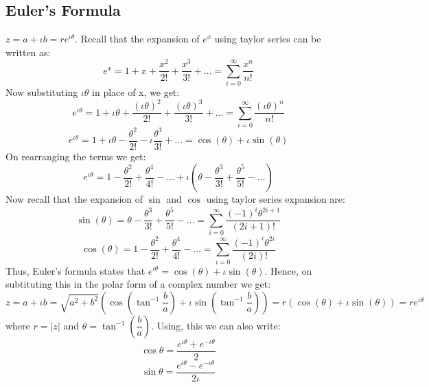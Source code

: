 \documentclass[12pt, oneside]{book}
\theoremstyle{definition}
\theoremstyle{definition}
\theoremstyle{remark}
\begin{document}
\subsection{Euler's Formula}
$z=a+\iota b=re^{\iota \theta}$. Recall that the expansion of $e^x$ using taylor series can be written as:
\[ e^x=1+x+\dfrac{x^2}{2!}+\dfrac{x^3}{3!}+\ldots = \sum_{i=0}^{\infty} \dfrac{x^n}{n!}\]
Now substituting $\iota \theta$ in place of x, we get:
\[ e^{\iota \theta}=1+\iota \theta+\dfrac{(\iota \theta)^2}{2!}+\dfrac{(\iota \theta)^3}{3!}+\ldots = \sum_{i=0}^{\infty} \dfrac{(\iota \theta)^n}{n!}\]
\[ e^{\iota \theta}=1+\iota \theta-\dfrac{\theta^2}{2!}-\iota \dfrac{\theta^3}{3!}+\ldots = \cos(\theta)+\iota \sin(\theta) \]
On rearranging the terms we get:
\[ e^{\iota \theta}= 1-\dfrac{\theta^2}{2!} + \dfrac{\theta^4}{4!} - \ldots + \iota(\theta-\dfrac{\theta^3}{3!}+\dfrac{\theta^5}{5!}-\ldots) \]
Now recall that the expansion of $\sin$ and $\cos$ using taylor series expansion are:
\[ \sin(\theta)=\theta-\dfrac{\theta^3}{3!}+\dfrac{\theta^5}{5!}-\ldots = \sum_{i=0}^{\infty} \dfrac{(-1)^i\theta^{2i+1}}{(2i+1)!} \]
\[ \cos(\theta)=1-\dfrac{\theta^2}{2!}+\dfrac{\theta^4}{4!}-\ldots = \sum_{i=0}^{\infty} \dfrac{(-1)^i\theta^{2i}}{(2i)!} \]
Thus, Euler's formula states that $e^{\iota \theta}=\cos(\theta)+\iota \sin(\theta)$.
Hence, on subtituting this in the polar form of a complex number we get:
\[ z=a+\iota b = \sqrt{a^2 + b^2} (\cos \left(\tan^{-1}\frac{b}{a}\right) + \iota \sin \left(\tan^{-1}\frac{b}{a}\right))=r(\cos(\theta)+\iota \sin(\theta))=re^{\iota \theta} \]
where $r=|z|$ and $\theta=\tan^{-1}(\dfrac{b}{a})$.
Using, this we can also write:
\[ \cos \theta = \frac{e^{\iota \theta}+e^{-\iota \theta}}{2} \] 
\[ \sin \theta = \frac{e^{\iota \theta}-e^{-\iota \theta}}{2\iota} \]
\end{document}
